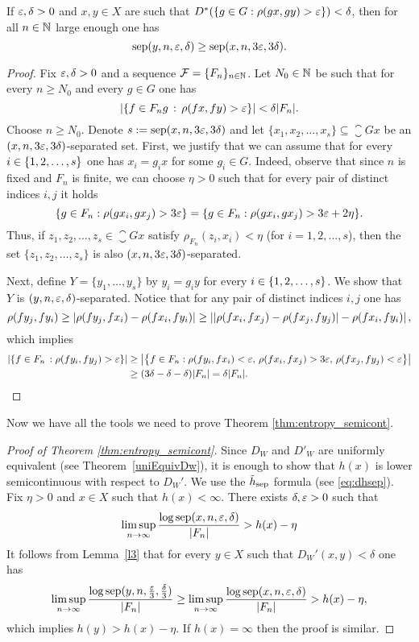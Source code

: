\begin{lem}\label{l3}
If $\varepsilon,\delta>0$ and $x,y\in X$ are such that $D^*(\{g\in G :  \rho(gx, gy)>\varepsilon\})<\delta$, then for all $n\in\mathbb{N}$ large enough one has
\[
\operatorname{sep}(y,n,\varepsilon, \delta)\geq \operatorname{sep}(x, n, 3\varepsilon, 3\delta).
\]  
\end{lem}

\begin{proof}
Fix $\varepsilon,\delta>0$ and a \Folner sequence $\mathcal F=\{F_n\}_{n\in\mathbb{N}}$. Let $N_0\in\mathbb{N}$ be such that for every $n\geq N_0$  and every $g\in G$ one has
\[
\left|\left\{f\in F_ng\,:\,\rho(fx, fy)>\varepsilon\right\}\right|<\delta|F_n|.
\]
Choose $n\geq N_0$. Denote $s:=\operatorname{sep}(x,n, 3\varepsilon, 3\delta)$ and let $\{x_1,x_2,\ldots, x_s\}\subseteq\closure{Gx}$ be an $(x,n, 3\varepsilon, 3\delta)$-separated set. 
%
First, we justify that we can assume that for every $ i\in\left\{1,2,\ldots,s\right\}$ one has $x_i=g_ix$ for some $g_i\in G$. 
%
Indeed, observe that since $n$ is fixed and $F_n$ is finite, we can choose $\eta>0$ such that for every pair of distinct indices  $i, j$ it holds
\[
\{g\in F_n: \rho(gx_i,gx_j)>3\varepsilon\} =  \{g\in F_n: \rho(gx_i,gx_j)>3\varepsilon+2\eta\}.
\] 
%
Thus, if $z_1,z_2,\ldots,z_s\in \closure{Gx}$ satisfy $\rho_{F_n}(z_i, x_i)<\eta$  (for $i=1,2,\ldots,s$), then the set $\{z_1,z_2, \ldots, z_s\}$ is also $(x,n, 3\varepsilon, 3\delta)$-separated.

Next, define $Y=\{y_1, \ldots, y_s\}$ by $y_i=g_i y$ for every $i\in\left\{1,2,\ldots,s\right\}$. We show that $Y$ is $(y,n, \varepsilon, \delta)$-separated.
Notice that for any pair of distinct indices  $i, j$ one has 
\[
\rho(fy_j,fy_i)\geq |\rho(fy_j,fx_i)-\rho(fx_i,fy_i)|\geq \left|\left|\rho(fx_i,fx_j)-\rho(fx_j,fy_j)\right|-\rho(fx_i,fy_i)\right|,
\]
which implies
\begin{align*}
\left|\left\{f\in F_n\,:\rho(fy_i,fy_j)>\varepsilon\right\}\right|
&\geq\big|\big\{f\in F_n:\rho(fy_i, fx_i)<\varepsilon,\, \rho(fx_i, fx_j)>3\varepsilon,\, \rho(fx_j, fy_j)<\varepsilon\big\}\big|\\ 
&\geq(3\delta-\delta-\delta)|F_n|=\delta|F_n|. \qedhere
\end{align*}
\end{proof}

\noindent
Now we have all the tools we need to prove Theorem \ref{thm:entropy_semicont}.

\begin{proof}[Proof of Theorem \ref{thm:entropy_semicont}]
Since $D_W$ and $D'_W$ are uniformly equivalent (see Theorem~\ref{uniEquivDw}), it is enough to show that $h(x)$ is lower semicontinuous with respect to $D_W'$. We use the $\tilde{h}_{\mathrm{sep}}$ formula (see \eqref{eq:dhsep}).
Fix $\eta>0$ and $x\in X$ such that $h(x)<\infty$. There exists $\delta,\varepsilon>0$ such that 
\[
\limsup_{n\to\infty}\frac{\log \operatorname{sep}(x,n,\varepsilon, \delta)}{|F_n|}> h(x)-\eta
\]
 It follows from Lemma~\ref{l3} that for every $y\in X$ such that $D_W'(x,y)<\delta$ one has
\[
\limsup_{n\to\infty}\frac{\log \operatorname{sep}(y,n,\frac{\varepsilon}{3}, \frac{\delta}{3})}{|F_n|}\geq\limsup_{n\to\infty}\frac{\log \operatorname{sep}(x,n,\varepsilon, \delta)}{|F_n|}> h(x)-\eta,
\]
which implies $h(y)>h(x)-\eta$.
If $h(x)=\infty$ then the proof is similar.
\end{proof}

